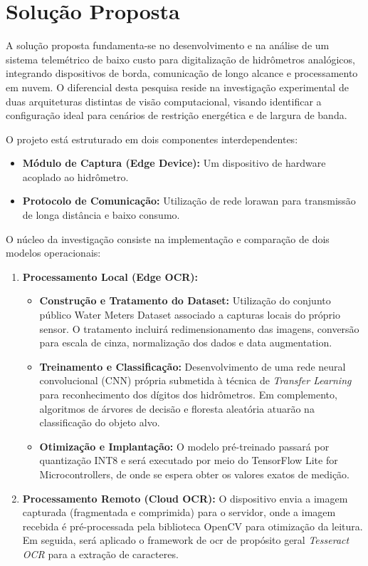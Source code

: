 \section{Solução Proposta}
\label{sec:solucao}

A solução proposta fundamenta-se no desenvolvimento e na análise de um sistema telemétrico
de baixo custo para digitalização de hidrômetros analógicos, integrando dispositivos de borda,
comunicação de longo alcance e processamento em nuvem. 
O diferencial desta pesquisa reside na investigação experimental de duas arquiteturas distintas de visão computacional,
visando identificar a configuração ideal para cenários de restrição energética e de largura de banda.

O projeto está estruturado em dois componentes interdependentes:

\begin{itemize}
    \item \textbf{Módulo de Captura (Edge Device):} Um dispositivo de hardware acoplado ao hidrômetro.
    \item \textbf{Protocolo de Comunicação:} Utilização de rede \gls{lorawan} para transmissão de longa distância e baixo consumo.
\end{itemize}

O núcleo da investigação consiste na implementação e comparação de dois modelos operacionais:

\begin{enumerate}
    \item \textbf{Processamento Local (Edge OCR):} 
      \begin{itemize}
        \item \textbf{Construção e Tratamento do Dataset:} Utilização do conjunto público Water Meters Dataset  associado a capturas locais do próprio sensor. O tratamento incluirá redimensionamento das imagens, conversão para escala de cinza, normalização dos dados e data augmentation.
        \item \textbf{Treinamento e Classificação:} Desenvolvimento de uma rede neural convolucional (CNN) própria submetida à técnica de \textit{Transfer Learning} para reconhecimento dos dígitos dos hidrômetros. Em complemento, algoritmos de árvores de decisão e floresta aleatória atuarão na classificação do objeto alvo.
        \item \textbf{Otimização e Implantação:} O modelo pré-treinado passará por quantização INT8 e será executado por meio do TensorFlow Lite for Microcontrollers, de onde se espera obter os valores exatos de medição.
      \end{itemize}
    \item \textbf{Processamento Remoto (Cloud OCR):} O dispositivo envia a imagem capturada (fragmentada e comprimida) para o servidor, onde a imagem recebida é pré-processada pela biblioteca OpenCV para otimização da leitura. Em seguida, será aplicado o framework de \gls{ocr} de propósito geral \textit{Tesseract OCR} para a extração de caracteres.
\end{enumerate}

